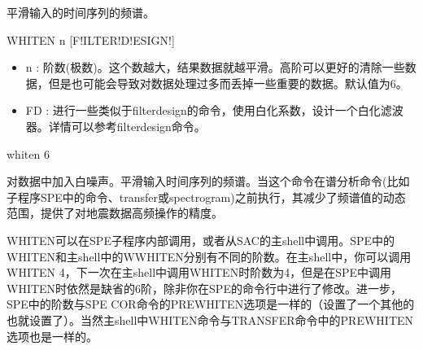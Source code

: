 \label{cmd:whiten}

平滑输入的时间序列的频谱。

\begin{SACSTX}
WHITEN n [F!ILTER!D!ESIGN!]
\end{SACSTX}

\begin{itemize}
\item n :  阶数(极数)。这个数越大，结果数据就越平滑。高阶可以更好的清除一些数据，但是也可能会导致对数据处理过多而丢掉一些重要的数据。默认值为6。 
\item FD : 进行一些类似于filterdesign的命令，使用白化系数，设计一个白化滤波器。详情可以参考filterdesign命令。
\end{itemize}

\begin{SACDFT}
whiten 6
\end{SACDFT}


对数据中加入白噪声。平滑输入时间序列的频谱。当这个命令在谱分析命令(比如子程序SPE中的命令、transfer或spectrogram)之前执行，其减少了频谱值的动态范围，提供了对地震数据高频操作的精度。

WHITEN可以在SPE子程序内部调用，或者从SAC的主shell中调用。SPE中的WHITEN和主shell中的WWHITEN分别有不同的阶数。在主shell中，你可以调用WHITEN 4，下一次在主shell中调用WHITEN时阶数为4，但是在SPE中调用WHITEN时依然是缺省的6阶，除非你在SPE的命令行中进行了修改。进一步，SPE中的阶数与SPE COR命令的PREWHITEN选项是一样的（设置了一个其他的也就设置了）。当然主shell中WHITEN命令与TRANSFER命令中的PREWHITEN选项也是一样的。

